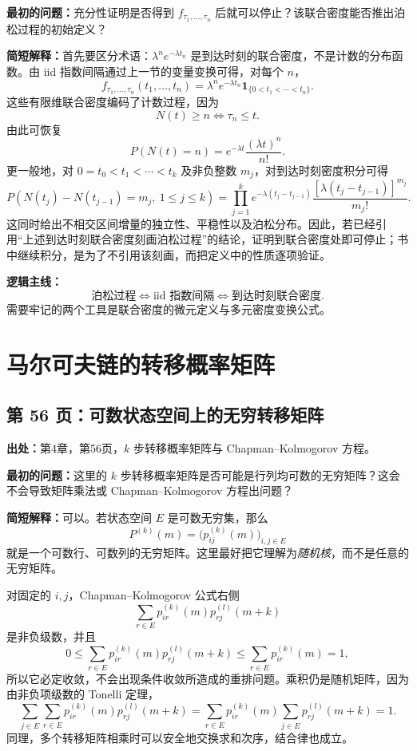 \documentclass[11pt,a4paper]{ctexart}
\begin{document}
\textbf{最初的问题：}充分性证明是否得到
$f_{\tau_1,\ldots,\tau_n}$ 后就可以停止？该联合密度能否推出泊松过程的初始定义？

\textbf{简短解释：}首先要区分术语：$\lambda^n e^{-\lambda t_n}$ 是到达时刻的联合密度，不是计数的分布函数。由 iid 指数间隔通过上一节的变量变换可得，对每个 $n$，
\[
 f_{\tau_1,\ldots,\tau_n}(t_1,\ldots,t_n)
 =\lambda^n e^{-\lambda t_n}\mathbf 1_{\{0<t_1<\cdots<t_n\}}.
\]
这些有限维联合密度编码了计数过程，因为
\[
 N(t)\ge n\iff \tau_n\le t.
\]
由此可恢复
\[
 P(N(t)=n)=e^{-\lambda t}\frac{(\lambda t)^n}{n!}.
\]
更一般地，对 $0=t_0<t_1<\cdots<t_k$ 及非负整数 $m_j$，对到达时刻密度积分可得
\[
 P\!\left(N(t_j)-N(t_{j-1})=m_j,\ 1\le j\le k\right)
 =\prod_{j=1}^k e^{-\lambda(t_j-t_{j-1})}
 \frac{[\lambda(t_j-t_{j-1})]^{m_j}}{m_j!}.
\]
这同时给出不相交区间增量的独立性、平稳性以及泊松分布。因此，若已经引用“上述到达时刻联合密度刻画泊松过程”的结论，证明到联合密度处即可停止；书中继续积分，是为了不引用该刻画，而把定义中的性质逐项验证。

\textbf{逻辑主线：}
\[
 \text{泊松过程}
 \Longleftrightarrow \text{iid 指数间隔}
 \Longleftrightarrow \text{到达时刻联合密度}.
\]
需要牢记的两个工具是联合密度的微元定义与多元密度变换公式。

\section{马尔可夫链的转移概率矩阵}

\subsection{第 56 页：可数状态空间上的无穷转移矩阵}
\label{note:sp-markov-countable-transition-matrix}
\textbf{出处：}第4章，第56页，$k$ 步转移概率矩阵与 Chapman--Kolmogorov 方程。

\textbf{最初的问题：}这里的 $k$ 步转移概率矩阵是否可能是行列均可数的无穷矩阵？这会不会导致矩阵乘法或 Chapman--Kolmogorov 方程出问题？

\textbf{简短解释：}可以。若状态空间 $E$ 是可数无穷集，那么
\[
 P^{(k)}(m)=\bigl(p_{ij}^{(k)}(m)\bigr)_{i,j\in E}
\]
就是一个可数行、可数列的无穷矩阵。这里最好把它理解为\emph{随机核}，而不是任意的无穷矩阵。

对固定的 $i,j$，Chapman--Kolmogorov 公式右侧
\[
 \sum_{r\in E}p_{ir}^{(k)}(m)p_{rj}^{(l)}(m+k)
\]
是非负级数，并且
\[
 0\le \sum_{r\in E}p_{ir}^{(k)}(m)p_{rj}^{(l)}(m+k)
 \le \sum_{r\in E}p_{ir}^{(k)}(m)=1,
\]
所以它必定收敛，不会出现条件收敛所造成的重排问题。乘积仍是随机矩阵，因为由非负项级数的 Tonelli 定理，
\[
 \sum_{j\in E}\sum_{r\in E}p_{ir}^{(k)}(m)p_{rj}^{(l)}(m+k)
 =\sum_{r\in E}p_{ir}^{(k)}(m)\sum_{j\in E}p_{rj}^{(l)}(m+k)=1.
\]
同理，多个转移矩阵相乘时可以安全地交换求和次序，结合律也成立。
\end{document}
